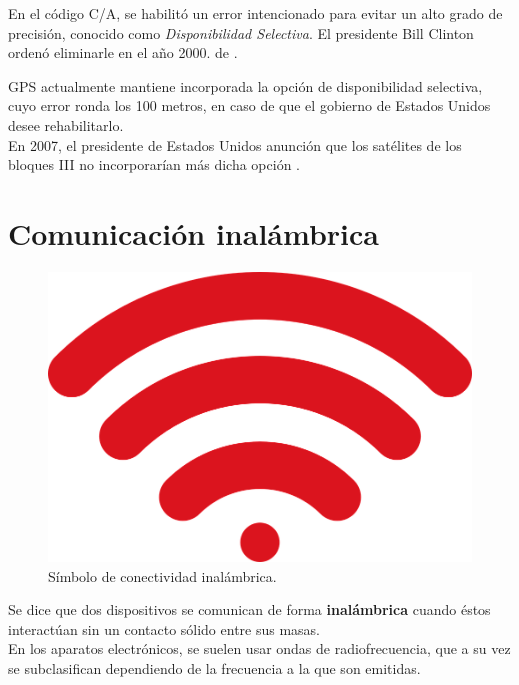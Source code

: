 En el código C/A, se habilitó un error intencionado para evitar un alto grado de precisión, conocido como \textit{Disponibilidad Selectiva}. El presidente Bill Clinton ordenó eliminarle en el año 2000. de \cite{termal2014prototipo}.

GPS actualmente mantiene incorporada la opción de disponibilidad selectiva, cuyo error ronda los 100 metros, en caso de que el gobierno de Estados Unidos desee rehabilitarlo. \\

En 2007, el presidente de Estados Unidos anunción que los satélites de los bloques III no incorporarían más dicha opción \cite{chafer2017diseno}.

\section{Comunicación inalámbrica}

\begin{figure}[ht]
\centering
\includegraphics[scale=0.14]{Figures/wireless2}
\caption[Símbolo de conectividad inalámbrica.]{Símbolo de conectividad inalámbrica\footnotemark.}
\label{fig:ErrWrl}
\end{figure}


Se dice que dos dispositivos se comunican de forma \textbf{inalámbrica} cuando éstos interactúan sin un contacto sólido entre sus masas. \\

En los aparatos electrónicos, se suelen usar ondas de radiofrecuencia, que a su vez se subclasifican dependiendo de la frecuencia a la que son emitidas.\\

